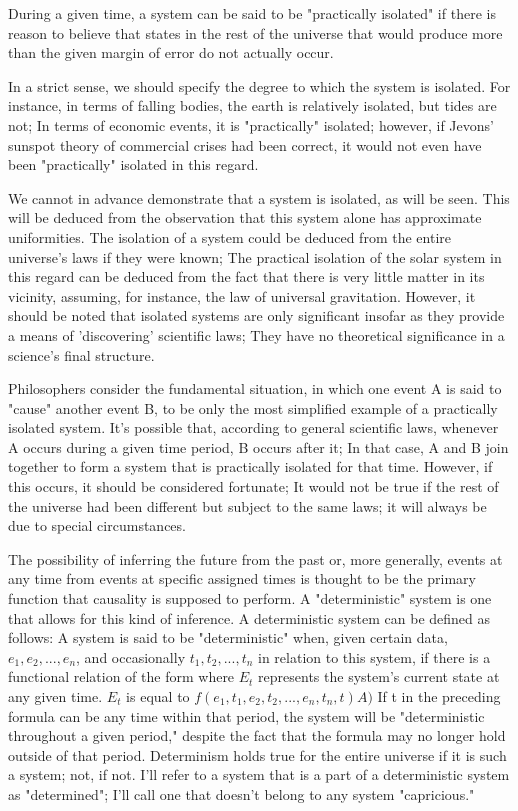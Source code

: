 \documentclass[a4paper,12pt]{book}[2004/02/16]
\theoremstyle{ilemma}
\theoremstyle{itheorem}
\theoremstyle{iother}
\theoremstyle{icorollary}
\theoremstyle{numcorollary}
\theoremstyle{idefinition}
\begin{document}
During a given time, a system can be said to be "practically isolated" if there is reason to believe that states in the rest of the universe that would produce more than the given margin of error do not actually occur.

In a strict sense, we should specify the degree to which the system is isolated. For instance, in terms of falling bodies, the earth is relatively isolated, but tides are not; In terms of economic events, it is "practically" isolated; however, if Jevons' sunspot theory of commercial crises had been correct, it would not even have been "practically" isolated in this regard.

We cannot in advance demonstrate that a system is isolated, as will be seen. This will be deduced from the observation that this system alone has approximate uniformities. The isolation of a system could be deduced from the entire universe's laws if they were known; The practical isolation of the solar system in this regard can be deduced from the fact that there is very little matter in its vicinity, assuming, for instance, the law of universal gravitation. However, it should be noted that isolated systems are only significant insofar as they provide a means of 'discovering' scientific laws; They have no theoretical significance in a science's final structure.

Philosophers consider the fundamental situation, in which one event A is said to "cause" another event B, to be only the most simplified example of a practically isolated system. It's possible that, according to general scientific laws, whenever A occurs during a given time period, B occurs after it; In that case, A and B join together to form a system that is practically isolated for that time. However, if this occurs, it should be considered fortunate; It would not be true if the rest of the universe had been different but subject to the same laws; it will always be due to special circumstances.

The possibility of inferring the future from the past or, more generally, events at any time from events at specific assigned times is thought to be the primary function that causality is supposed to perform.
A "deterministic" system is one that allows for this kind of inference. A deterministic system can be defined as follows: A system is said to be "deterministic" when, given certain data, $e_1, e_2,..., e_n$, and occasionally $t_1, t_2,..., t_n$ in relation to this system, if there is a functional relation of the form where $E_t$ represents the system's current state at any given time. $E_t$ is equal to $f (e_1, t_1, e_2, t_2,..., e_n, t_n, t) A)$ If t in the preceding formula can be any time within that period, the system will be "deterministic throughout a given period," despite the fact that the formula may no longer hold outside of that period. Determinism holds true for the entire universe if it is such a system; not, if not. I'll refer to a system that is a part of a deterministic system as "determined"; I'll call one that doesn't belong to any system "capricious."
\end{document}
